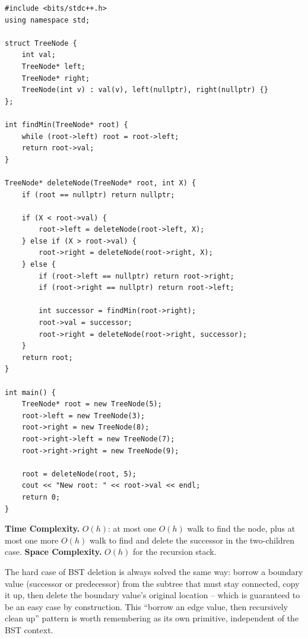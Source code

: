 \begin{lstlisting}
#include <bits/stdc++.h>
using namespace std;

struct TreeNode {
    int val;
    TreeNode* left;
    TreeNode* right;
    TreeNode(int v) : val(v), left(nullptr), right(nullptr) {}
};

int findMin(TreeNode* root) {
    while (root->left) root = root->left;
    return root->val;
}

TreeNode* deleteNode(TreeNode* root, int X) {
    if (root == nullptr) return nullptr;

    if (X < root->val) {
        root->left = deleteNode(root->left, X);
    } else if (X > root->val) {
        root->right = deleteNode(root->right, X);
    } else {
        if (root->left == nullptr) return root->right;
        if (root->right == nullptr) return root->left;

        int successor = findMin(root->right);
        root->val = successor;
        root->right = deleteNode(root->right, successor);
    }
    return root;
}

int main() {
    TreeNode* root = new TreeNode(5);
    root->left = new TreeNode(3);
    root->right = new TreeNode(8);
    root->right->left = new TreeNode(7);
    root->right->right = new TreeNode(9);

    root = deleteNode(root, 5);
    cout << "New root: " << root->val << endl;
    return 0;
}
\end{lstlisting}

\begin{complexitybox}
\textbf{Time Complexity.} $O(h)$: at most one $O(h)$ walk to find the
node, plus at most one more $O(h)$ walk to find and delete the successor
in the two-children case.
\textbf{Space Complexity.} $O(h)$ for the recursion stack.
\end{complexitybox}

\begin{takeawaybox}
The hard case of BST deletion is always solved the same way: borrow a
boundary value (successor or predecessor) from the subtree that must stay
connected, copy it up, then delete the boundary value's original location
-- which is guaranteed to be an easy case by construction. This
``borrow an edge value, then recursively clean up'' pattern is worth
remembering as its own primitive, independent of the BST context.
\end{takeawaybox}
